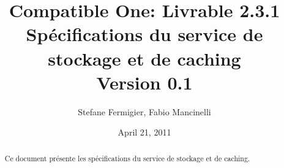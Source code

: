 \documentclass[a4paper,11pt]{article}
\title{Compatible One: Livrable 2.3.1\\
Spécifications du service de stockage et de caching\\
Version 0.1}
\date{April 21, 2011}
\author{Stefane Fermigier, Fabio Mancinelli}
\begin{document}
\maketitle
\begin{abstract}
  Ce document présente les spécifications du service de stockage et de caching.
\end{abstract}

\tableofcontents

\pagebreak


\end{document}
